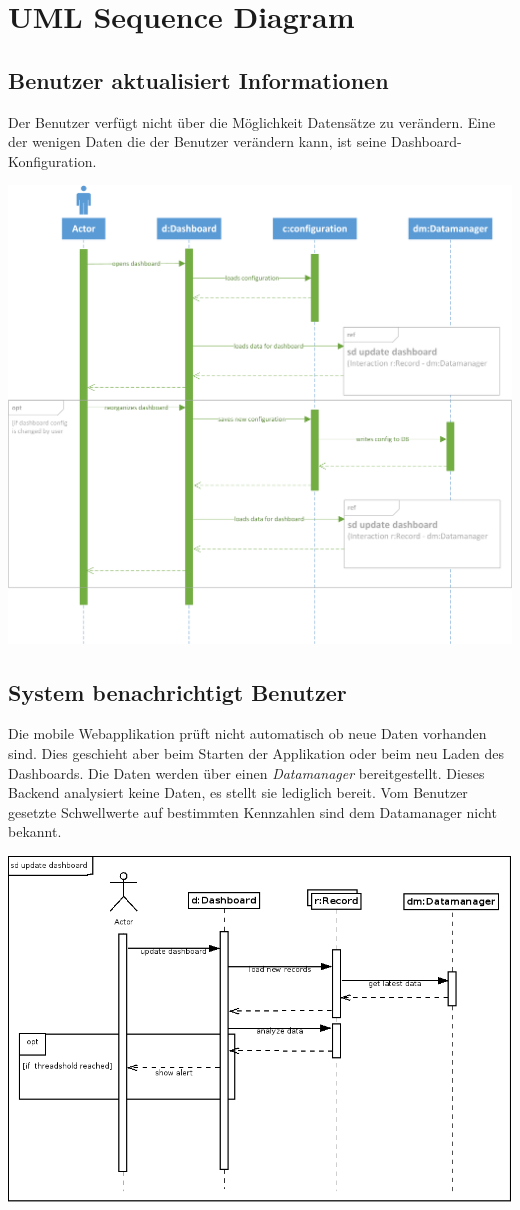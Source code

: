 \documentclass[a4paper]{scrreprt}
\begin{document}
\chapter{UML Sequence Diagram}

\section{Benutzer aktualisiert Informationen}
Der Benutzer verfügt nicht über die Möglichkeit Datensätze zu verändern. Eine der wenigen Daten die der Benutzer verändern kann, ist seine Dashboard-Konfiguration.

\bigskip

\includegraphics[width=1\textwidth]{./sequence_update.png}

\section{System benachrichtigt Benutzer}
Die mobile Webapplikation prüft nicht automatisch ob neue Daten vorhanden sind. Dies geschieht aber beim Starten der Applikation oder beim neu Laden des Dashboards.
Die Daten werden über einen \textit{Datamanager} bereitgestellt. Dieses Backend analysiert keine Daten, es stellt sie lediglich bereit. Vom Benutzer gesetzte Schwellwerte auf bestimmten Kennzahlen sind dem Datamanager nicht bekannt.

\bigskip

\includegraphics[width=1\textwidth]{./sequence_alert.png}
\end{document}
